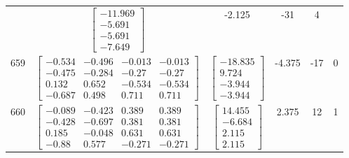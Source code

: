 \documentclass[a4paper,12pt]{article}
\begin{document}
\begin{tabular}{c c c c c c}
&
$\begin{bmatrix} -11.969 \\ -5.691 \\ -5.691 \\ -7.649 \end{bmatrix}$
&
-2.125
&
-31
&
4
\\
659
&
$\begin{bmatrix} -0.534 & -0.496 & -0.013 & -0.013 \\ -0.475 & -0.284 & -0.27 & -0.27 \\ 0.132 & 0.652 & -0.534 & -0.534 \\ -0.687 & 0.498 & 0.711 & 0.711 \end{bmatrix}$
&
$\begin{bmatrix} -18.835 \\ 9.724 \\ -3.944 \\ -3.944 \end{bmatrix}$
&
-4.375
&
-17
&
0
\\
660
&
$\begin{bmatrix} -0.089 & -0.423 & 0.389 & 0.389 \\ -0.428 & -0.697 & 0.381 & 0.381 \\ 0.185 & -0.048 & 0.631 & 0.631 \\ -0.88 & 0.577 & -0.271 & -0.271 \end{bmatrix}$
&
$\begin{bmatrix} 14.455 \\ -6.684 \\ 2.115 \\ 2.115 \end{bmatrix}$
&
2.375
&
12
&
1
\\
\end{tabular} \egroup \newpage
\end{document}
